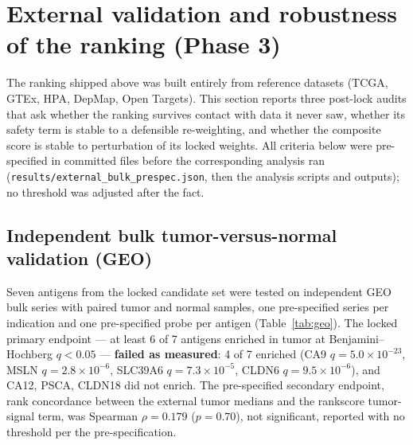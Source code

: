 \section{External validation and robustness of the ranking (Phase 3)}
\label{sec:external}

The ranking shipped above was built entirely from reference datasets (TCGA, GTEx,
HPA, DepMap, Open Targets). This section reports three post-lock audits that ask
whether the ranking survives contact with data it never saw, whether its safety
term is stable to a defensible re-weighting, and whether the composite score is
stable to perturbation of its locked weights. All criteria below were
pre-specified in committed files before the corresponding analysis ran
(\texttt{results/external\_bulk\_prespec.json}, then the analysis scripts and
outputs); no threshold was adjusted after the fact.

\subsection{Independent bulk tumor-versus-normal validation (GEO)}
Seven antigens from the locked candidate set were tested on independent GEO bulk
series with paired tumor and normal samples, one pre-specified series per
indication and one pre-specified probe per antigen (Table~\ref{tab:geo}). The
locked primary endpoint --- at least 6 of 7 antigens enriched in tumor at
Benjamini--Hochberg $q < 0.05$ --- \textbf{failed as measured}: 4 of 7 enriched
(CA9 $q = 5.0\times10^{-23}$, MSLN $q = 2.8\times10^{-6}$, SLC39A6
$q = 7.3\times10^{-5}$, CLDN6 $q = 9.5\times10^{-6}$), and CA12, PSCA, CLDN18 did
not enrich. The pre-specified secondary endpoint, rank concordance between the
external tumor medians and the rankscore tumor-signal term, was
Spearman $\rho = 0.179$ ($p = 0.70$), not significant, reported with no threshold
per the pre-specification.

